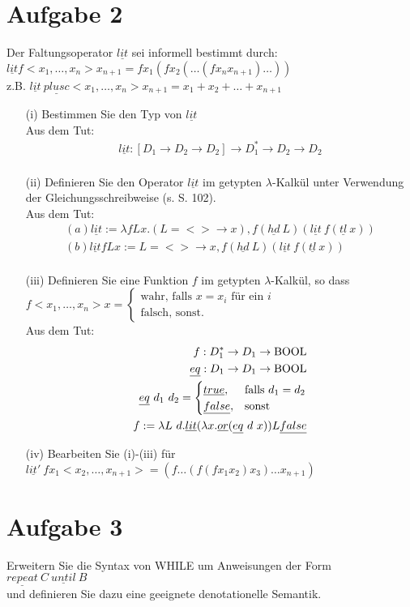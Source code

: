 \documentclass[ngerman,a4paper]{report}
\begin{document}
\section*{Aufgabe 2}
Der Faltungsoperator $\underline{lit}$ sei informell bestimmt durch:
$\underline{lit} f<x_1,\dots,x_n>x_{n+1} = fx_1(fx_2(\dots(fx_n x_{n+1})\dots))$\\
z.B. $\underline{lit} \ \underline{plusc}<x_1,\dots,x_n>x_{n+1} = x_1 + x_2 + \dots + x_{n+1}$\\
\begin{itemize}
\item[(i)] Bestimmen Sie den Typ von $\underline{lit}$\\
Aus dem Tut:
\begin{align*}
\underline{lit}: [D_1 \rightarrow D_2 \rightarrow D_2] \rightarrow D_1^* \rightarrow D_2 \rightarrow D_2\\
\end{align*}
\item[(ii)] Definieren Sie den Operator $\underline{lit}$ im getypten $\lambda$-Kalkül unter Verwendung der Gleichungsschreibweise (s. S. 102).\\
Aus dem Tut:
\begin{align*}
(a) \underline{lit} := \lambda	 f L x. (L = <> \rightarrow x), f (\underline{hd}\ L) (\underline{lit}\ f(\underline{tl}\ x))\\
(b) \underline{lit}	 f L x := L = <> \rightarrow x, f (\underline{hd}\ L) (\underline{lit}\ f(\underline{tl}\ x))\\
\end{align*}
\item[(iii)] Definieren Sie eine Funktion $f$ im getypten $\lambda$-Kalkül, so dass\\
$
f<x_1,\dots,x_n>x=\begin{cases}
\text{wahr, falls } x=x_i \text{ für ein } i\\
\text{falsch, sonst.}
\end{cases}
$\\
Aus dem Tut:
\begin{align*}
f : D_1^* \rightarrow D_1 \rightarrow \text{\lstinline!BOOL!}\\
\underline{eq} : D_1 \rightarrow D_1 \rightarrow \text{\lstinline!BOOL!}\\
\underline{eq}\ d_1 \ d_2 = \begin{cases} \underline{true}, &\text{falls } d_1 = d_2 \\ \underline{false}, &\text{sonst}
\end{cases}\\
f := \lambda L\ d.\underline{lit}(\lambda x. \underline{or} (\underline{eq}\ d\ x)) L \underline{false}\\
\end{align*}
\item[(iv)] Bearbeiten Sie (i)-(iii) für $\underline{lit'}\ fx_1<x_2,\dots,x_{n+1}>=(f\dots(f(fx_1 x_2)x_3)\dots x_{n+1})$
\end{itemize}

\section*{Aufgabe 3}
Erweitern Sie die Syntax von WHILE um Anweisungen der Form\\
$\underline{repeat}\ C\ \underline{until}\ B$\\
und definieren Sie dazu eine geeignete denotationelle Semantik.
\end{document}
